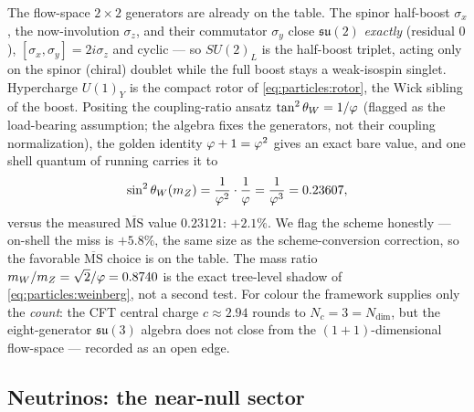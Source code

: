 The flow-space $2\times2$ generators are already on the table. The spinor
half-boost $\sigma_x$, the now-involution $\sigma_z$, and their commutator
$\sigma_y$ close $\mathfrak{su}(2)$ \emph{exactly} (residual $0$),
$[\sigma_x,\sigma_y]=2i\sigma_z$ and cyclic --- so $SU(2)_L$ is the half-boost
triplet, acting only on the spinor (chiral) doublet while the full boost stays a
weak-isospin singlet. Hypercharge $U(1)_Y$ is the compact rotor of
\eqref{eq:particles:rotor}, the Wick sibling of the boost. Positing the
coupling-ratio ansatz $\tan^2\theta_W=1/\varphi$ (flagged as the load-bearing
assumption; the algebra fixes the generators, not their coupling normalization),
the golden identity $\varphi+1=\varphi^2$ gives an exact bare value, and one shell
quantum of running carries it to
\begin{equation}
\sin^2\theta_W(m_Z)=\frac{1}{\varphi^2}\cdot\frac{1}{\varphi}=\frac{1}{\varphi^3}
=0.23607,
\label{eq:particles:weinberg}
\end{equation}
versus the measured $\overline{\text{MS}}$ value $0.23121$: $+2.1\%$. We flag the
scheme honestly --- on-shell the miss is $+5.8\%$, the same size as the
scheme-conversion correction, so the favorable $\overline{\text{MS}}$ choice is on
the table. The mass ratio $m_W/m_Z=\sqrt2/\varphi=0.8740$ is the exact tree-level
shadow of \eqref{eq:particles:weinberg}, not a second test. For colour the
framework supplies only the \emph{count}: the CFT central charge $c\approx 2.94$
rounds to $N_c=3=N_{\dim}$, but the eight-generator $\mathfrak{su}(3)$ algebra
does not close from the $(1{+}1)$-dimensional flow-space --- recorded as an open
edge.

\subsection{Neutrinos: the near-null sector}

